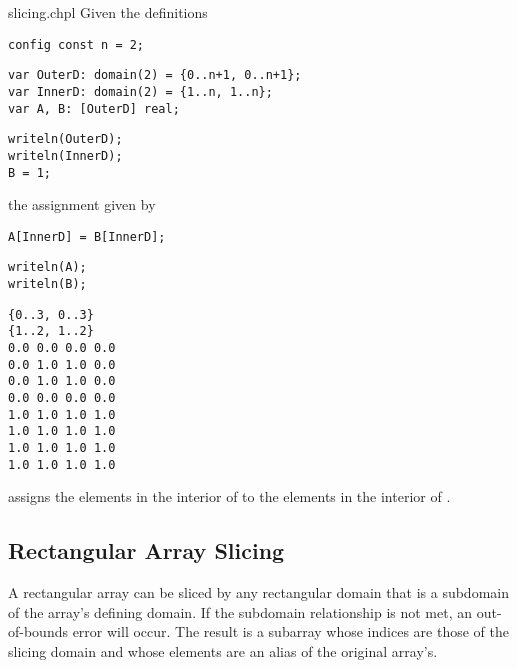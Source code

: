 \begin{chapelexample}{slicing.chpl}
Given the definitions
\begin{chapelpre}
\begin{verbatim}
config const n = 2;
\end{verbatim}
\end{chapelpre}
\begin{chapel}
\begin{verbatim}
var OuterD: domain(2) = {0..n+1, 0..n+1};
var InnerD: domain(2) = {1..n, 1..n};
var A, B: [OuterD] real;
\end{verbatim}
\end{chapel}
\begin{chapelnoprint}
\begin{verbatim}
writeln(OuterD);
writeln(InnerD);
B = 1;
\end{verbatim}
\end{chapelnoprint}
the assignment given by
\begin{chapel}
\begin{verbatim}
A[InnerD] = B[InnerD];
\end{verbatim}
\end{chapel}
\begin{chapelpost}
\begin{verbatim}
writeln(A);
writeln(B);
\end{verbatim}
\end{chapelpost}
\begin{chapeloutput}
\begin{verbatim}
{0..3, 0..3}
{1..2, 1..2}
0.0 0.0 0.0 0.0
0.0 1.0 1.0 0.0
0.0 1.0 1.0 0.0
0.0 0.0 0.0 0.0
1.0 1.0 1.0 1.0
1.0 1.0 1.0 1.0
1.0 1.0 1.0 1.0
1.0 1.0 1.0 1.0
\end{verbatim}
\end{chapeloutput}
assigns the elements in the interior of  to the elements in
the interior of .
\end{chapelexample}

\subsection{Rectangular Array Slicing}
\label{Rectangular_Array_Slicing}

A rectangular array can be sliced by any rectangular domain that is a
subdomain of the array's defining domain.  If the subdomain
relationship is not met, an out-of-bounds error will occur.  The
result is a subarray whose indices are those of the slicing domain and
whose elements are an alias of the original array's.

